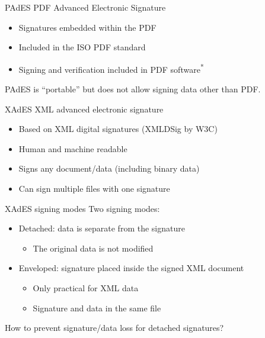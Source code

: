 \begin{frame}{PAdES}
  PDF Advanced Electronic Signature
  \begin{itemize}[<+(1)->]
    \item Signatures embedded within the PDF
    \item Included in the ISO PDF standard
    \item Signing and verification included in PDF software\textsuperscript{*}
  \end{itemize}

  \vspace*{1em}

  \pause
  PAdES is \enquote{portable} but does not allow signing data other than PDF.
\end{frame}

\begin{frame}{XAdES}
  XML advanced electronic signature
  \begin{itemize}[<+(1)->]
    \item Based on XML digital signatures (XMLDSig by W3C)
    \item Human and machine readable
    \item Signs any document/data (including binary data)
    \item Can sign multiple files with one signature
  \end{itemize}    
\end{frame}

\begin{frame}{XAdES signing modes}
  Two signing modes:
  \begin{itemize}[<+(1)->]
    \item Detached: data is separate from the signature
    \begin{itemize}
      \item The original data is not modified
    \end{itemize}
    \item Enveloped: signature placed inside the signed XML document
    \begin{itemize}
      \item Only practical for XML data
      \item Signature and data in the same file
    \end{itemize}
  \end{itemize}

  \vspace*{1em}

  \pause
  How to prevent signature/data loss for detached signatures?
\end{frame}

